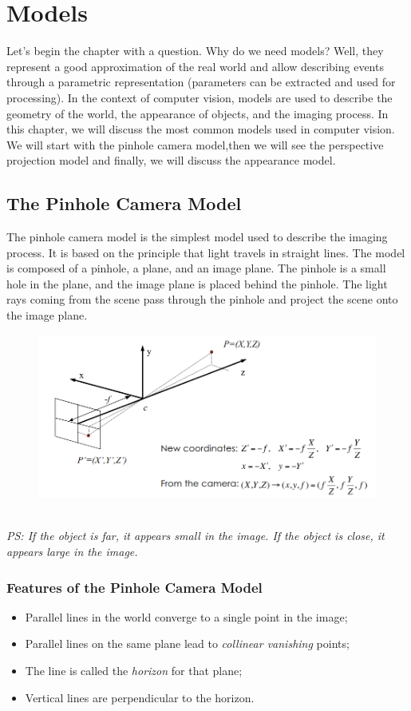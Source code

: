 \chapter{Models}
Let's begin the chapter with a question. Why do we need models?
Well, they represent a good approximation of the real world and allow describing events through a parametric representation (parameters can be extracted and used for processing). In the context of computer vision, models are used to describe the geometry of the world, the appearance of objects, and the imaging process. In this chapter, we will discuss the most common models used in computer vision. We will start with the pinhole camera model,then we will see the perspective projection model and finally, we will discuss the appearance model.
\section{The Pinhole Camera Model}
The pinhole camera model is the simplest model used to describe the imaging process. It is based on the principle that light travels in straight lines. The model is composed of a pinhole, a plane, and an image plane. The pinhole is a small hole in the plane, and the image plane is placed behind the pinhole. The light rays coming from the scene pass through the pinhole and project the scene onto the image plane. 
\begin{figure}[h]
    \centering
    \includegraphics[width=1\textwidth]{Figures/Pinhole.png}
\end{figure}
\\\textit{PS: If the object is far, it appears small in the image. If the object is close, it appears large in the image.}
\subsection{Features of the Pinhole Camera Model}
\begin{itemize}
    \item Parallel lines in the world converge to a single point in the image;
    \item Parallel lines on the same plane lead to \textit{collinear vanishing} points;
    \item The line is called the \textit{horizon} for that plane;
    \item Vertical lines are perpendicular to the horizon.
\end{itemize}
